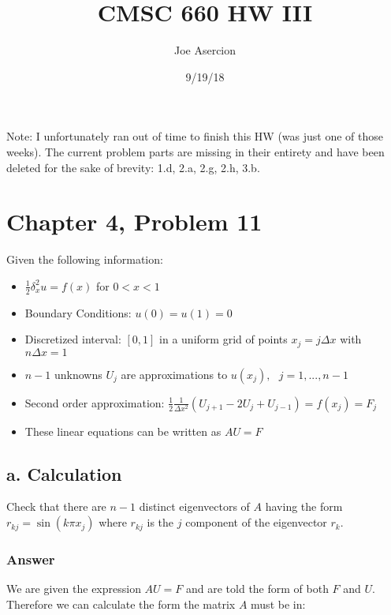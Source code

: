 \documentclass{article}
\title{CMSC 660 HW III}
\date{9/19/18}
\author{Joe Asercion}
\newcommand{\n}{\newline}
\begin{document}
	\maketitle

	Note: I unfortunately ran out of time to finish this HW (was just one of those weeks).  The current problem parts are missing in their entirety and have been deleted for the sake of brevity: 1.d, 2.a, 2.g, 2.h, 3.b.\n
	
	\section{Chapter 4, Problem 11}
	Given the following information:
	\begin{itemize}
		\item $\frac{1}{2}\delta_{x}^{2}u=f(x)$ for $0<x<1$ 
		\item Boundary Conditions: $u(0)=u(1)=0$
		\item Discretized interval: $[0,1]$ in a uniform grid of points $x_{j}=j\Delta x$ with $n\Delta x=1$
		\item  $n-1$ unknowns $U_{j}$ are approximations to $u(x_{j}),\text{ }j=1,...,n-1$
		\item Second order approximation: $\frac{1}{2}\frac{1}{\Delta x^{2}}(U_{j+1}-2U_{j}+U_{j-1})=f(x_j)=F_j$\\
		\item These linear equations can be written as $AU=F$
	\end{itemize}
	\subsection{a. Calculation}
	Check that there are $n-1$ distinct eigenvectors of $A$ having the form $r_{kj}=\sin(k\pi x_{j})$ where $r_{kj}$ is the $j$ component of the eigenvector $r_{k}$.
	\subsubsection{Answer}
	
	We are given the expression $AU=F$ and are told the form of both $F$ and $U$.  Therefore we can calculate the form the matrix $A$ must be in: \n
	
\end{document}
